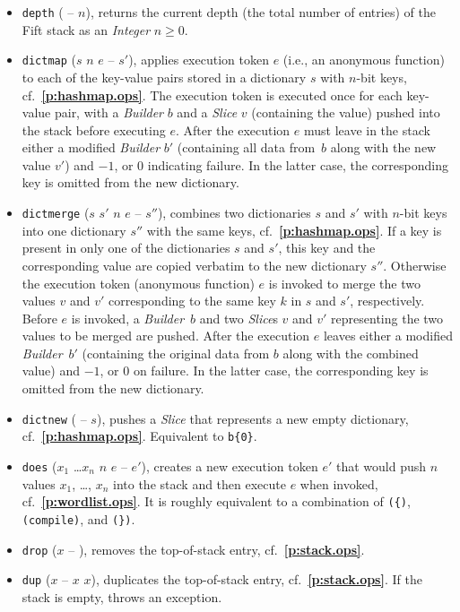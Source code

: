 \documentclass[12pt,oneside]{article}
\def\refpoint#1{{\rm\textbf{\ref{#1}}}}
\let\ptref=\refpoint
\begin{document}
\begin{itemize}
\item {\tt depth} ( -- $n$), returns the current depth (the total number of entries) of the Fift stack as an {\em Integer\/} $n\geq0$.
\item {\tt dictmap} ($s$ $n$ $e$ -- $s'$), applies execution token $e$ (i.e., an anonymous function) to each of the key-value pairs stored in a dictionary $s$ with $n$-bit keys, cf.~\ptref{p:hashmap.ops}. The execution token is executed once for each key-value pair, with a {\em Builder\/} $b$ and a {\em Slice\/} $v$ (containing the value) pushed into the stack before executing $e$. After the execution $e$ must leave in the stack either a modified {\em Builder\/} $b'$ (containing all data from~$b$ along with the new value $v'$) and $-1$, or $0$ indicating failure. In the latter case, the corresponding key is omitted from the new dictionary.
\item {\tt dictmerge} ($s$ $s'$ $n$ $e$ -- $s''$), combines two dictionaries $s$ and $s'$ with $n$-bit keys into one dictionary $s''$ with the same keys, cf.~\ptref{p:hashmap.ops}. If a key is present in only one of the dictionaries $s$ and $s'$, this key and the corresponding value are copied verbatim to the new dictionary $s''$. Otherwise the execution token (anonymous function) $e$ is invoked to merge the two values $v$ and $v'$ corresponding to the same key $k$ in $s$ and $s'$, respectively. Before $e$ is invoked, a {\em Builder\/}~$b$ and two {\em Slice\/}s $v$ and $v'$ representing the two values to be merged are pushed. After the execution $e$ leaves either a modified {\em Builder\/}~$b'$ (containing the original data from $b$ along with the combined value) and $-1$, or $0$ on failure. In the latter case, the corresponding key is omitted from the new dictionary.
\item {\tt dictnew} ( -- $s$), pushes a {\em Slice\/} that represents a new empty dictionary, cf.~\ptref{p:hashmap.ops}. Equivalent to {\tt b\{0\}}.
\item {\tt does} ($x_1$ \dots $x_n$ $n$ $e$ -- $e'$), creates a new execution token $e'$ that would push $n$ values $x_1$, \dots, $x_n$ into the stack and then execute $e$ when invoked, cf.~\ptref{p:wordlist.ops}. It is roughly equivalent to a combination of {\tt (\{)}, {\tt (compile)}, and {\tt (\})}.
\item {\tt drop} ($x$ -- ), removes the top-of-stack entry, cf.~\ptref{p:stack.ops}.
\item {\tt dup} ($x$ -- $x$ $x$), duplicates the top-of-stack entry, cf.~\ptref{p:stack.ops}. If the stack is empty, throws an exception.

\end{itemize}
\end{document}
